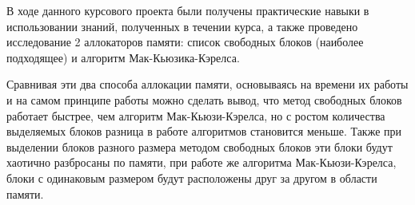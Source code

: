 \documentclass[a4paper, 12pt]{article}
\begin{document}
В ходе данного курсового проекта были получены практические навыки в использовании знаний,
полученных в течении курса, а также проведено исследование 2 аллокаторов памяти: 
список свободных блоков (наиболее подходящее) и алгоритм Мак-Кьюзика-Кэрелса.

Сравнивая эти два способа аллокации памяти, основываясь на времени их работы и 
на самом принципе работы можно сделать вывод, что метод свободных блоков работает быстрее, чем 
алгоритм Мак-Кьюзи-Кэрелса, но с ростом количества выделяемых блоков разница в работе алгоритмов становится меньше.
Также при выделении блоков разного размера методом свободных блоков эти блоки будут хаотично разбросаны по памяти, 
при работе же алгоритма Мак-Кьюзи-Кэрелса, блоки с одинаковым размером будут расположены друг за другом в области памяти.
\end{document}
